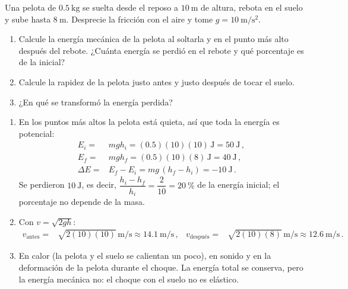 \documentclass[12pt, a4paper]{article}
\begin{document}
\begin{exercise}[ID=rebote, tags={parcial2}, points=17, nuevapagina=true]
Una pelota de $\qty{0.5}{\kilo\g}$ se suelta desde el reposo a $\qty{10}{\m}$ de altura, rebota en el suelo y sube hasta $\qty{8}{\m}$. Desprecie la fricción con el aire y tome $g=\qty{10}{\m/\s^2}$.
\begin{enumerate}
    \item Calcule la energía mecánica de la pelota al soltarla y en el punto más alto después del rebote. ¿Cuánta energía se perdió en el rebote y qué porcentaje es de la inicial?
    \item Calcule la rapidez de la pelota justo antes y justo después de tocar el suelo.
    \item ¿En qué se transformó la energía perdida?
\end{enumerate}
\end{exercise}
\begin{solution}
\begin{enumerate}
    \item En los puntos más altos la pelota está quieta, así que toda la energía es potencial:
    \begin{align}
        E_i =& mgh_i = (0.5)(10)(10)\,\unit{\joule} = \qty{50}{\joule}\,,\nonumber\\
        E_f =& mgh_f = (0.5)(10)(8)\,\unit{\joule} = \qty{40}{\joule}\,,\nonumber\\
        \Delta E =& E_f - E_i = mg\,(h_f - h_i) = \qty{-10}{\joule}\,.
    \end{align}
    Se perdieron $\qty{10}{\joule}$, es decir, $\dfrac{h_i - h_f}{h_i} = \dfrac{2}{10} = \qty{20}{\percent}$ de la energía inicial; el porcentaje no depende de la masa.
    \item Con $v=\sqrt{2gh}$:
    \begin{align}
        v_{\text{antes}} =& \sqrt{2(10)(10)}\,\unit{\m/\s} \approx \qty{14.1}{\m/\s}\,, &
        v_{\text{después}} =& \sqrt{2(10)(8)}\,\unit{\m/\s} \approx \qty{12.6}{\m/\s}\,.
    \end{align}
    \item En calor (la pelota y el suelo se calientan un poco), en sonido y en la deformación de la pelota durante el choque. La energía total se conserva, pero la energía mecánica no: el choque con el suelo no es elástico.
\end{enumerate}
\end{solution}
\end{document}
